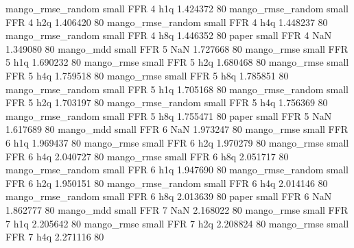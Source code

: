 mango_rmse_random      small      FFR                 4                  h1q  1.424372 80
mango_rmse_random      small      FFR                 4                  h2q  1.406420 80
mango_rmse_random      small      FFR                 4                  h4q  1.448237 80
mango_rmse_random      small      FFR                 4                  h8q  1.446352 80
            paper      small      FFR                 4                  NaN  1.349080 80
        mango_mdd      small      FFR                 5                  NaN  1.727668 80
       mango_rmse      small      FFR                 5                  h1q  1.690232 80
       mango_rmse      small      FFR                 5                  h2q  1.680468 80
       mango_rmse      small      FFR                 5                  h4q  1.759518 80
       mango_rmse      small      FFR                 5                  h8q  1.785851 80
mango_rmse_random      small      FFR                 5                  h1q  1.705168 80
mango_rmse_random      small      FFR                 5                  h2q  1.703197 80
mango_rmse_random      small      FFR                 5                  h4q  1.756369 80
mango_rmse_random      small      FFR                 5                  h8q  1.755471 80
            paper      small      FFR                 5                  NaN  1.617689 80
        mango_mdd      small      FFR                 6                  NaN  1.973247 80
       mango_rmse      small      FFR                 6                  h1q  1.969437 80
       mango_rmse      small      FFR                 6                  h2q  1.970279 80
       mango_rmse      small      FFR                 6                  h4q  2.040727 80
       mango_rmse      small      FFR                 6                  h8q  2.051717 80
mango_rmse_random      small      FFR                 6                  h1q  1.947690 80
mango_rmse_random      small      FFR                 6                  h2q  1.950151 80
mango_rmse_random      small      FFR                 6                  h4q  2.014146 80
mango_rmse_random      small      FFR                 6                  h8q  2.013639 80
            paper      small      FFR                 6                  NaN  1.862777 80
        mango_mdd      small      FFR                 7                  NaN  2.168022 80
       mango_rmse      small      FFR                 7                  h1q  2.205642 80
       mango_rmse      small      FFR                 7                  h2q  2.208824 80
       mango_rmse      small      FFR                 7                  h4q  2.271116 80
